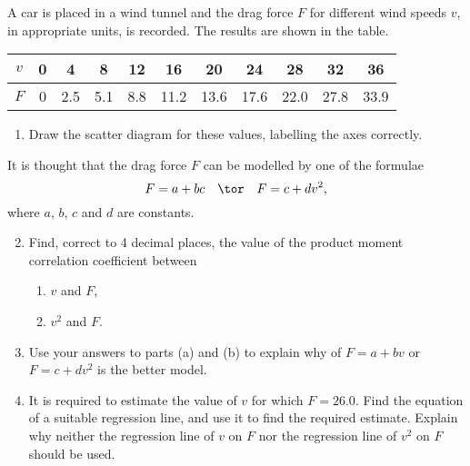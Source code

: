 \begin{problem}
    A car is placed in a wind tunnel and the drag force $F$ for different wind speeds $v$, in appropriate units, is recorded. The results are shown in the table.

    \begin{table}[H]
        \centering
        \begin{tabular}{|c|c|c|c|c|c|c|c|c|c|c|}
        \hline
        $v$ & 0 & 4 & 8 & 12 & 16 & 20 & 24 & 28 & 32 & 36 \\ \hline
        $F$ & 0 & 2.5 & 5.1 & 8.8 & 11.2 & 13.6 & 17.6 & 22.0 & 27.8 & 33.9 \\ \hline
        \end{tabular}
    \end{table}

    \begin{enumerate}
        \item Draw the scatter diagram for these values, labelling the axes correctly.
    \end{enumerate}

    It is thought that the drag force $F$ can be modelled by one of the formulae \[F = a + bc \quad \tor \quad F = c + dv^2,\] where $a$, $b$, $c$ and $d$ are constants.

    \begin{enumerate}
        \setcounter{enumi}{1}
        \item Find, correct to 4 decimal places, the value of the product moment correlation coefficient between
        \begin{enumerate}
            \item $v$ and $F$,
            \item $v^2$ and $F$.
        \end{enumerate}
        \item Use your answers to parts (a) and (b) to explain why of $F = a + bv$ or $F = c + dv^2$ is the better model.
        \item It is required to estimate the value of $v$ for which $F = 26.0$. Find the equation of a suitable regression line, and use it to find the required estimate. Explain why neither the regression line of $v$ on $F$ nor the regression line of $v^2$ on $F$ should be used.
    \end{enumerate}
\end{problem}
